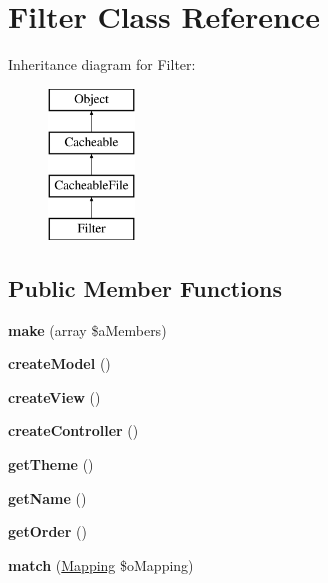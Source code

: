 \hypertarget{class_filter}{\section{Filter Class Reference}
\label{class_filter}
}
Inheritance diagram for Filter\-:\begin{figure}[H]
\begin{center}
\leavevmode
\includegraphics[height=4.000000cm]{class_filter}
\end{center}
\end{figure}
\subsection*{Public Member Functions}
\begin{DoxyCompactItemize}
\item 
\hypertarget{class_filter_a9aeaee07d29ca4c1dbf321d58ed7f50b}{{\bfseries make} (array \$a\-Members)}\label{class_filter_a9aeaee07d29ca4c1dbf321d58ed7f50b}

\item 
\hypertarget{class_filter_aab83565357bb1aa347a965af5da91d79}{{\bfseries create\-Model} ()}\label{class_filter_aab83565357bb1aa347a965af5da91d79}

\item 
\hypertarget{class_filter_a5fd595bf845cc7f588db94c5862473b9}{{\bfseries create\-View} ()}\label{class_filter_a5fd595bf845cc7f588db94c5862473b9}

\item 
\hypertarget{class_filter_ad2fbdddc832e58f2629ba18544e4798a}{{\bfseries create\-Controller} ()}\label{class_filter_ad2fbdddc832e58f2629ba18544e4798a}

\item 
\hypertarget{class_filter_aa0ec21772e6fc018b8d2dcc7c9164597}{{\bfseries get\-Theme} ()}\label{class_filter_aa0ec21772e6fc018b8d2dcc7c9164597}

\item 
\hypertarget{class_filter_a19581cc2d47970caaa22268e8441a6ac}{{\bfseries get\-Name} ()}\label{class_filter_a19581cc2d47970caaa22268e8441a6ac}

\item 
\hypertarget{class_filter_a5bb35a0f0b676a732353535c4aed70d6}{{\bfseries get\-Order} ()}\label{class_filter_a5bb35a0f0b676a732353535c4aed70d6}

\item 
\hypertarget{class_filter_a8d84f63b1b7d66b1cf626a76d39bb876}{{\bfseries match} (\hyperlink{class_mapping}{Mapping} \$o\-Mapping)}\label{class_filter_a8d84f63b1b7d66b1cf626a76d39bb876}

\end{DoxyCompactItemize}
